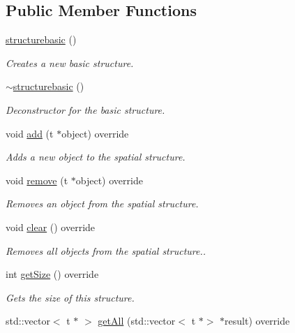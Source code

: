 \subsection*{Public Member Functions}
\begin{DoxyCompactItemize}
\item 
\hyperlink{classflounder_1_1structurebasic_a4cdb10b77f632a140476bfd33da7cdd7}{structurebasic} ()
\begin{DoxyCompactList}\small\item\em Creates a new basic structure. \end{DoxyCompactList}\item 
\hyperlink{classflounder_1_1structurebasic_a7ce24fc6a91e6a340d8526cc84b2f8ae}{$\sim$structurebasic} ()
\begin{DoxyCompactList}\small\item\em Deconstructor for the basic structure. \end{DoxyCompactList}\item 
void \hyperlink{classflounder_1_1structurebasic_a4e3549d986f547a8789d38cf8a820f18}{add} (t $\ast$object) override
\begin{DoxyCompactList}\small\item\em Adds a new object to the spatial structure. \end{DoxyCompactList}\item 
void \hyperlink{classflounder_1_1structurebasic_aad7fb3ea380f8af0bef40f86437db4cb}{remove} (t $\ast$object) override
\begin{DoxyCompactList}\small\item\em Removes an object from the spatial structure. \end{DoxyCompactList}\item 
void \hyperlink{classflounder_1_1structurebasic_a080579359485a5b32489a004c70da095}{clear} () override
\begin{DoxyCompactList}\small\item\em Removes all objects from the spatial structure.. \end{DoxyCompactList}\item 
int \hyperlink{classflounder_1_1structurebasic_aaef414a91ef6bd96982b1f7c10ae31b2}{get\+Size} () override
\begin{DoxyCompactList}\small\item\em Gets the size of this structure. \end{DoxyCompactList}\item 
std\+::vector$<$ t $\ast$ $>$ \hyperlink{classflounder_1_1structurebasic_a6e3292d86b68b829540f011593dec6eb}{get\+All} (std\+::vector$<$ t $\ast$$>$ $\ast$result) override
$$
\end{DoxyCompactItemize}
